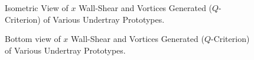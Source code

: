\begin{figure}[!htbp]
    \centering
    \noindent{}
    \caption{Isometric View of $x$ Wall-Shear and Vortices Generated ($Q$-Criterion) of Various Undertray Prototypes.}
    \label{fig:UTP_ISO_QCRIT_ALL_COMPARE}
\end{figure}

\vspace{-1cm}

\begin{figure}[!htbp]
    \centering
    \noindent{}
    \caption{Bottom view of $x$ Wall-Shear and Vortices Generated ($Q$-Criterion) of Various Undertray Prototypes.}
    \label{fig:UTP_BOTTOM_QCRIT_ALL_COMPARE}
\end{figure}


